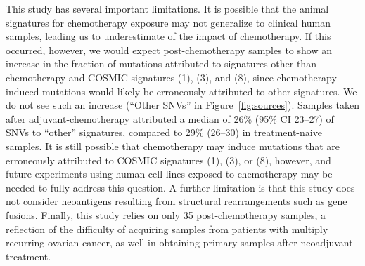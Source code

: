 This study has several important limitations. It is possible that the animal signatures for chemotherapy exposure may not generalize to clinical human samples, leading us to underestimate of the impact of chemotherapy. If this occurred, however, we would expect post-chemotherapy samples to show an increase in the fraction of mutations attributed to signatures other than chemotherapy and COSMIC signatures (1), (3), and (8), since chemotherapy-induced mutations would likely be erroneously attributed to other signatures. We do not see such an increase (``Other SNVs'' in Figure~\ref{fig:sources}). Samples taken after adjuvant-chemotherapy attributed a median of 26\% (95\% CI 23--27) of SNVs to ``other'' signatures, compared to 29\% (26--30) in treatment-naive samples. It is still possible that chemotherapy may induce mutations that are erroneously attributed to COSMIC signatures (1), (3), or (8), however, and future experiments using human cell lines exposed to chemotherapy may be needed to fully address this question. A further limitation is that this study does not consider neoantigens resulting from structural rearrangements such as gene fusions. Finally, this study relies on only 35 post-chemotherapy samples, a reflection of the difficulty of acquiring samples from patients with multiply recurring ovarian cancer, as well in obtaining primary samples after neoadjuvant treatment.


